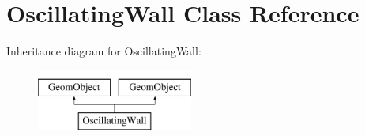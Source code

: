 \hypertarget{classOscillatingWall}{}\section{Oscillating\+Wall Class Reference}
\label{classOscillatingWall}
Inheritance diagram for Oscillating\+Wall\+:\begin{figure}[H]
\begin{center}
\leavevmode
\includegraphics[height=2.000000cm]{classOscillatingWall}
\end{center}
\end{figure}
